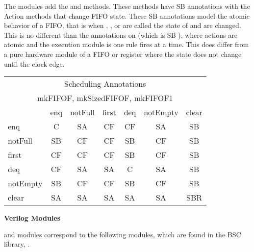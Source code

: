 The  modules add the  and 
methods. These methods have SB annotations with the Action methods
that change FIFO state.  These SB annotations model  the atomic
behavior of a  FIFO, that
is when , , or  are called the state of
 and  are changed.  This is no different than
the annotations on  (which is  SB ),
where actions are atomic and the execution module is one rule fires at
a time.  This does differ from a pure hardware module of a FIFO or
register where the state does not change until the clock edge.

\begin{center}
\begin{tabular}{|p{.75 in}|c|c|c|c|c|c|}
\hline
\multicolumn{7}{|c|}{Scheduling Annotations}\\
\multicolumn{7}{|c|}{mkFIFOF, mkSizedFIFOF, mkFIFOF1}\\
\hline
&enq&notFull&first&deq&notEmpty&clear\\
\hline
\hline
 enq&C &SA&CF&CF&SA&SB\\
\hline
 notFull&SB&CF&CF&SB&CF&SB\\
\hline
 first&CF&CF&CF&SB&CF&SB\\
\hline
 deq&CF&SA&SA&C&SA&SB\\
\hline
 notEmpty&SB&CF&CF&SB&CF&SB\\
\hline
 clear&SA&SA&SA&SA&SA&SBR\\
\hline
\hline
\end{tabular}
\end{center}



{\bf Verilog Modules}

 and  modules correspond to the following {\V}
modules, which are found in the BSC {\V} library, .

